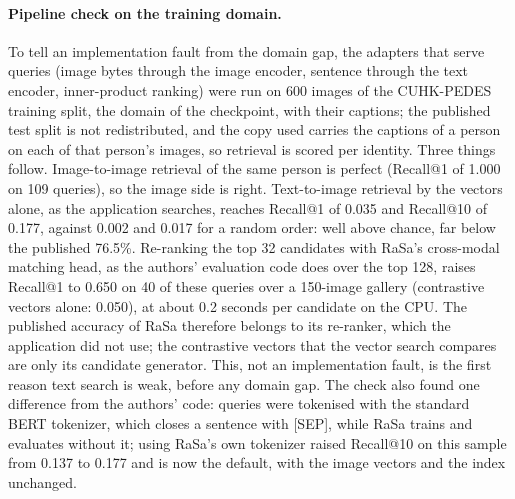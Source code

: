 \paragraph{Pipeline check on the training domain.} To tell an implementation fault from the domain gap, the adapters that serve queries (image bytes through the image encoder, sentence through the text encoder, inner-product ranking) were run on 600 images of the CUHK-PEDES training split, the domain of the checkpoint, with their captions; the published test split is not redistributed, and the copy used carries the captions of a person on each of that person's images, so retrieval is scored per identity. Three things follow. Image-to-image retrieval of the same person is perfect (Recall@1 of 1.000 on 109 queries), so the image side is right. Text-to-image retrieval by the vectors alone, as the application searches, reaches Recall@1 of 0.035 and Recall@10 of 0.177, against 0.002 and 0.017 for a random order: well above chance, far below the published 76.5\%. Re-ranking the top 32 candidates with RaSa's cross-modal matching head, as the authors' evaluation code does over the top 128, raises Recall@1 to 0.650 on 40 of these queries over a 150-image gallery (contrastive vectors alone: 0.050), at about 0.2 seconds per candidate on the CPU. The published accuracy of RaSa therefore belongs to its re-ranker, which the application did not use; the contrastive vectors that the vector search compares are only its candidate generator. This, not an implementation fault, is the first reason text search is weak, before any domain gap. The check also found one difference from the authors' code: queries were tokenised with the standard BERT tokenizer, which closes a sentence with [SEP], while RaSa trains and evaluates without it; using RaSa's own tokenizer raised Recall@10 on this sample from 0.137 to 0.177 and is now the default, with the image vectors and the index unchanged.


